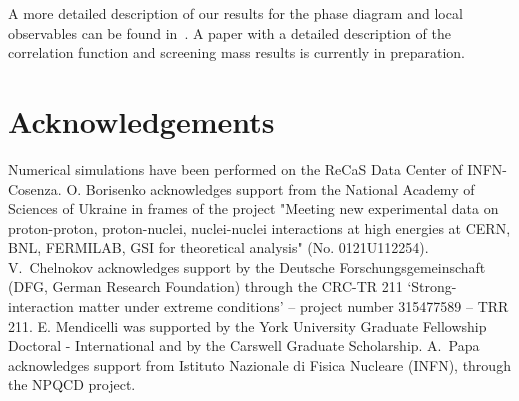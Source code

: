 \documentclass[a4paper,11pt]{article}
\begin{document}
A more detailed description of our results for the phase diagram and local observables can be found in~\cite{local-observables}. A paper with a detailed description of the correlation function and screening mass results is currently in preparation.

\section*{Acknowledgements}

Numerical simulations have been performed on the ReCaS Data Center of INFN-Cosenza.
O. Borisenko acknowledges support from the National
Academy of Sciences of Ukraine in frames of the project
"Meeting new experimental data on proton-proton, proton-nuclei,
nuclei-nuclei interactions at high energies at CERN, BNL,
FERMILAB, GSI for theoretical analysis" (No. 0121U112254).
V.~Chelnokov acknowledges support by the Deutsche Forschungsgemeinschaft 
(DFG, German Research Foundation) through the CRC-TR 211 
‘Strong-interaction matter under extreme conditions’ – project number 315477589 – TRR 211. 
E. Mendicelli was supported by the York University Graduate Fellowship Doctoral - International and by the Carswell Graduate Scholarship.
A.~Papa acknowledges support from Istituto Nazionale di Fisica Nucleare (INFN), through the NPQCD project.
\end{document}
